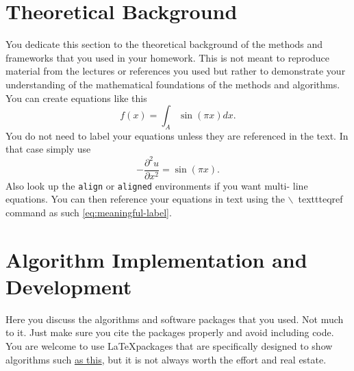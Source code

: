 \documentclass[11pt]{amsart}
\begin{document}
\section{Theoretical Background}\label{sec:theory}
You dedicate this section to the theoretical background of the methods and
frameworks
that you used in your homework. This is not meant to reproduce material from the
lectures
or references you used but rather to demonstrate your understanding of the
mathematical foundations of the methods and algorithms. You can create equations
like this
\begin{equation*}
f(x) = \int_A \sin( \pi x) dx.
\end{equation*}
You do not need to label your equations unless they are referenced in the text. In
that
case simply use
\begin{equation}\label{eq:meaningful-label}
- \frac{\partial^2 u}{\partial x^2} = \sin ( \pi x).
\end{equation}
Also look up the \texttt{align} or \texttt{aligned} environments if you want multi-
line
equations. You can then reference your equations in text using the $\backslash$\
texttt{eqref}
command as such \eqref{eq:meaningful-label}.
\section{Algorithm Implementation and Development}\label{sec:algorithms}
Here you discuss the algorithms and software packages that you used. Not much to
it.
Just make sure you cite the packages properly and avoid including code.
You are welcome to use \LaTeX packages that are specifically designed to show
algorithms such \href{https://www.overleaf.com/learn/latex/Algorithms}{as this},
but it is
not always worth the effort and real estate.
\end{document}
